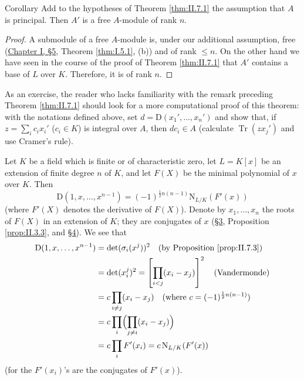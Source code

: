 \begin{statement}{Corollary}
Add to the hypotheses of Theorem \ref{thm:II.7.1} the assumption that $A$ is
principal. Then $A'$ is a free $A$-module of rank $n$.
\end{statement}

\begin{proof}
A submodule of a free $A$-module is, under our additional assumption, free
(\hyperref[sec:1.5]{Chapter I, §5}, Theorem \ref{thm:I.5.1}, (b)) and of rank $\leq n$. On the
other hand we have seen in the course of the proof of Theorem
\ref{thm:II.7.1} that $A'$ contains a base of $L$ over $K$. Therefore, it is
of rank $n$.
\end{proof}

As an exercise, the reader who lacks familiarity with the remark preceding
Theorem \ref{thm:II.7.1} should look for a more computational proof of this
theorem: with the notations defined above, set
$d=\mathrm{D}(x_{1}',\ldots,x_{n}')$ and show that, if
$z=\sum_{i}c_{i}x_{i}'$ ($c_{i}\in K$) is integral over $A$, then
$dc_{i}\in A$ (calculate $\operatorname{Tr}(zx_{j}')$ and use Cramer's
rule).


Let $K$ be a field which is finite or of characteristic zero, let
$L=K[x]$ be an extension of finite degree $n$ of $K$, and let $F(X)$ be the
minimal polynomial of $x$ over $K$. Then
\begin{equation}
\mathrm{D}(1,x,\ldots,x^{n-1})=(-1)^{\frac{1}{2}n(n-1)}
\mathrm{N}_{L/K}(F'(x))
\label{eq:II.7.6}
\end{equation}
(where $F'(X)$ denotes the derivative of $F(X)$). Denote by
$x_{1},\ldots,x_{n}$ the roots of $F(X)$ in an extension of $K$; they are
conjugates of $x$ (\hyperref[sec:2.3]{§3}, Proposition \ref{prop:II.3.3}, and \hyperref[sec:2.4]{§4}). We see that
\[
\begin{aligned}
\mathrm{D}(1,x,\ldots,x^{n-1})
&=\det(\sigma_{i}(x^{j}))^{2}\quad\text{(by Proposition \ref{prop:II.7.3})}\\
&=\det(x_{i}^{j})^{2}=\left[\prod_{i<j}(x_{i}-x_{j})\right]^{2}
\quad\text{(Vandermonde)}\\
&=c\prod_{i\neq j}(x_{i}-x_{j})\quad
\text{(where }c=(-1)^{\frac{1}{2}n(n-1)}\text{)}\\
&=c\prod_{i}\Bigl(\prod_{j\neq i}(x_{i}-x_{j})\Bigr)\\
&=c\prod_{i}F'(x_{i})=c\,\mathrm{N}_{L/K}(F'(x))
\end{aligned}
\]
(for the $F'(x_{i})$'s are the conjugates of $F'(x)$).

